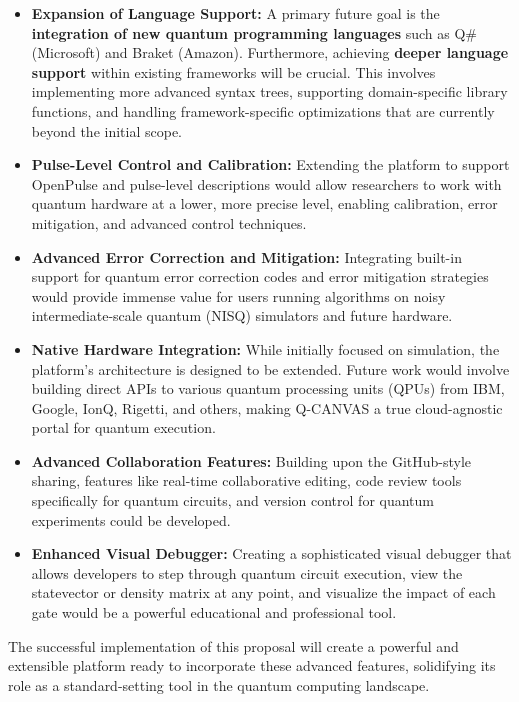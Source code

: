 \begin{itemize}
    \item \textbf{Expansion of Language Support:} A primary future goal is the \textbf{integration of new quantum programming languages} such as Q\# (Microsoft) and Braket (Amazon). Furthermore, achieving \textbf{deeper language support} within existing frameworks will be crucial. This involves implementing more advanced syntax trees, supporting domain-specific library functions, and handling framework-specific optimizations that are currently beyond the initial scope.
    \item \textbf{Pulse-Level Control and Calibration:} Extending the platform to support OpenPulse and pulse-level descriptions would allow researchers to work with quantum hardware at a lower, more precise level, enabling calibration, error mitigation, and advanced control techniques.
    \item \textbf{Advanced Error Correction and Mitigation:} Integrating built-in support for quantum error correction codes and error mitigation strategies would provide immense value for users running algorithms on noisy intermediate-scale quantum (NISQ) simulators and future hardware.
    \item \textbf{Native Hardware Integration:} While initially focused on simulation, the platform's architecture is designed to be extended. Future work would involve building direct APIs to various quantum processing units (QPUs) from IBM, Google, IonQ, Rigetti, and others, making Q-CANVAS a true cloud-agnostic portal for quantum execution.
    \item \textbf{Advanced Collaboration Features:} Building upon the GitHub-style sharing, features like real-time collaborative editing, code review tools specifically for quantum circuits, and version control for quantum experiments could be developed.
    \item \textbf{Enhanced Visual Debugger:} Creating a sophisticated visual debugger that allows developers to step through quantum circuit execution, view the statevector or density matrix at any point, and visualize the impact of each gate would be a powerful educational and professional tool.
\end{itemize}

The successful implementation of this proposal will create a powerful and extensible platform ready to incorporate these advanced features, solidifying its role as a standard-setting tool in the quantum computing landscape.
